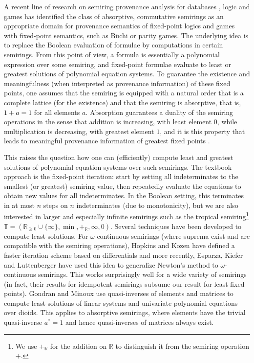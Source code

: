 \documentclass[english,runningheads,a4paper,envcountsame]{llncs}
\newcommand{\Trop}{\mathbb{T}}
\newcommand{\RR}{\mathbb{R}}
\newcommand{\Rplus}{+_\RR}
\begin{document}
A recent line of research on semiring provenance analysis for databases \cite{GreenKarTan07,DeutchMilRoyTan14,GreenTan17}, logic \cite{GraedelTan17,DannertGraNaaTan21} and games \cite{GraedelTan20} has identified the class of absorptive, commutative semirings as an appropriate domain for provenance semantics of fixed-point logics \cite{DannertGraNaaTan21} and games with fixed-point semantics, such as Büchi or parity games.
The underlying idea is to replace the Boolean evaluation of formulae by computations in certain semirings.
From this point of view, a formula is essentially a polynomial expression over some semiring, and fixed-point formulae evaluate to least or greatest solutions of polynomial equation systems.
To guarantee the existence and meaningfulness (when interpreted as provenance information) of these fixed points, one assumes that the semiring is equipped with a natural order that is a complete lattice (for the existence) and that the semiring is absorptive, that is, $1 + a = 1$ for all elements $a$.
Absorption guarantees a duality of the semiring operations in the sense that addition is increasing, with least element $0$, while multiplication is decreasing, with greatest element $1$, and it is this property that leads to meaningful provenance information of greatest fixed points \cite{DannertGraNaaTan21}.

This raises the question how one can (efficiently) compute least and greatest solutions of polynomial equation systems over such semirings.
The textbook approach is the fixed-point iteration: start by setting all indeterminates to the smallest (or greatest) semiring value, then repeatedly evaluate the equations to obtain new values for all indeterminates.
In the Boolean setting, this terminates in at most $n$ steps on $n$ indeterminates (due to monotonicity),
but we are also interested in larger and especially infinite semirings such as the tropical semiring\footnote{We use $\Rplus$ for the addition on $\RR$ to distinguish it from the semiring operation $+$.} $\Trop = (\RR_{\ge 0} \cup \{\infty\}, \min, \Rplus, \infty, 0)$.
%
Several techniques have been developed to compute least solutions. For $\omega$-continuous semirings (where suprema exist and are compatible with the semiring operations),
Hopkins and Kozen \cite{Kleene} have defined a faster iteration scheme based on differentials and more recently, Esparza, Kiefer and Luttenberger \cite{Newton} have used this idea to generalize Newton's method to $\omega$-continuous semirings.
This works surprisingly well for a wide variety of semirings (in fact, their results for idempotent semirings subsume our result for least fixed points).
%
Gondran and Minoux \cite{GondranMinoux08} use quasi-inverses of elements and matrices to compute least solutions of linear systems and univariate polynomial equations over dioids.
This applies to absorptive semirings, where elements have the trivial quasi-inverse $a^* = 1$ and hence quasi-inverses of matrices always exist.
\end{document}
